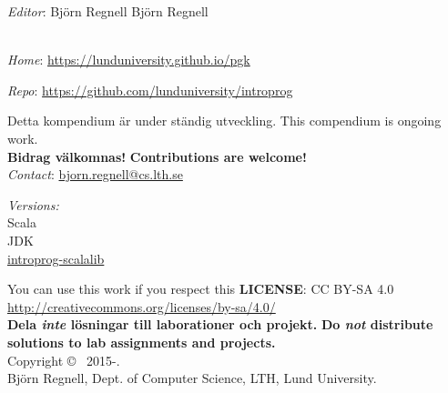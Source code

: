 
\clearpage\null\thispagestyle{empty}
\vfill

{
\setlength{\parindent}{0pt}
\emph{Editor}: \ifswedish Björn Regnell \else Björn Regnell \fi \\


~\\ \newline

\emph{Home}: \url{https://lunduniversity.github.io/pgk} \newline

\emph{Repo}: \url{https://github.com/lunduniversity/introprog} \\ \newline

\ifswedish Detta kompendium är under ständig utveckling. \else This compendium is ongoing work. \fi\\ \ifswedish \textbf{Bidrag välkomnas!} \else \textbf{Contributions are welcome!}\fi \\
\emph{Contact}: \url{bjorn.regnell@cs.lth.se}
\\ \newline


\emph{Versions:} \\
Scala \ScalaVersion \\
JDK \JDKVersion\\
\href{https://github.com/lunduniversity/introprog-scalalib/}{introprog-scalalib} \LibVersion \\ 

\vfill

You can use this work if you respect this \textbf{LICENSE}: CC BY-SA 4.0 \\
\url{http://creativecommons.org/licenses/by-sa/4.0/} \\
\ifswedish
\textbf{Dela \emph{inte} lösningar till laborationer och projekt.}
\else 
\textbf{Do \emph{not} distribute solutions to lab assignments and projects.}
\fi
\\ \newline
Copyright \copyright~ 2015-\CurrentYear. \\
Björn Regnell, Dept. of Computer Science, LTH, Lund University.\\
}
